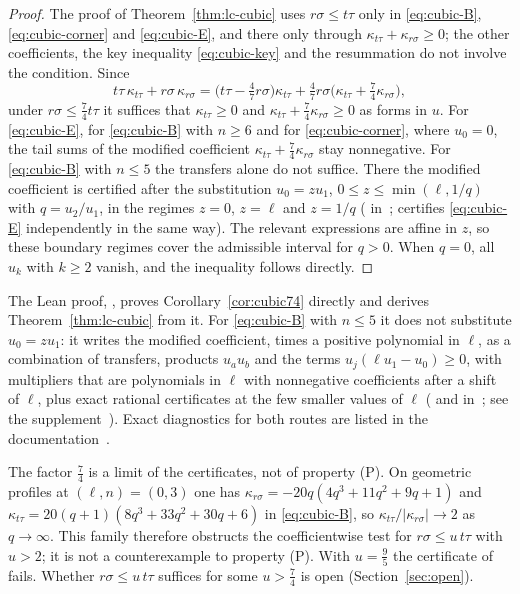 \begin{proof}
The proof of Theorem~\ref{thm:lc-cubic} uses $r\sigma\leq t\tau$ only in \eqref{eq:cubic-B}, \eqref{eq:cubic-corner} and \eqref{eq:cubic-E}, and there only through $\kappa_{t\tau}+\kappa_{r\sigma}\geq0$; the other coefficients, the key inequality \eqref{eq:cubic-key} and the resummation do not involve the condition. Since
\[
t\tau\,\kappa_{t\tau}+r\sigma\,\kappa_{r\sigma}=\bigl(t\tau-\tfrac47r\sigma\bigr)\kappa_{t\tau}+\tfrac47r\sigma\bigl(\kappa_{t\tau}+\tfrac74\kappa_{r\sigma}\bigr),
\]
under $r\sigma\leq\frac74t\tau$ it suffices that $\kappa_{t\tau}\geq0$ and $\kappa_{t\tau}+\frac74\kappa_{r\sigma}\geq0$ as forms in $u$. For \eqref{eq:cubic-E}, for \eqref{eq:cubic-B} with $n\geq6$ and for \eqref{eq:cubic-corner}, where $u_0=0$, the tail sums of the modified coefficient $\kappa_{t\tau}+\frac74\kappa_{r\sigma}$ stay nonnegative. For \eqref{eq:cubic-B} with $n\leq5$ the transfers alone do not suffice. There the modified coefficient is certified after the substitution $u_0=zu_1$, $0\leq z\leq\min(\ell,1/q)$ with $q=u_2/u_1$, in the regimes $z=0$, $z=\ell$ and $z=1/q$ ( in~\cite{code};  certifies \eqref{eq:cubic-E} independently in the same way). The relevant expressions are affine in $z$, so these boundary regimes cover the admissible interval for $q>0$. When $q=0$, all $u_k$ with $k\geq2$ vanish, and the inequality follows directly.
\end{proof}

The Lean proof, , proves Corollary~\ref{cor:cubic74} directly and derives Theorem~\ref{thm:lc-cubic} from it. For \eqref{eq:cubic-B} with $n\leq5$ it does not substitute $u_0=zu_1$: it writes the modified coefficient, times a positive polynomial in $\ell$, as a combination of transfers, products $u_au_b$ and the terms $u_j(\ell u_1-u_0)\geq0$, with multipliers that are polynomials in $\ell$ with nonnegative coefficients after a shift of $\ell$, plus exact rational certificates at the few smaller values of $\ell$ ( and  in~\cite{code}; see the supplement~\cite{suppB}). Exact diagnostics for both routes are listed in the documentation~\cite{docs}.

\begin{remark}\label{rem:cubic-limit}
The factor $\frac74$ is a limit of the certificates, not of property (P). On geometric profiles at $(\ell,n)=(0,3)$ one has $\kappa_{r\sigma}=-20q(4q^3+11q^2+9q+1)$ and $\kappa_{t\tau}=20(q+1)(8q^3+33q^2+30q+6)$ in \eqref{eq:cubic-B}, so $\kappa_{t\tau}/|\kappa_{r\sigma}|\to2$ as $q\to\infty$. This family therefore obstructs the coefficientwise test for $r\sigma\leq u\,t\tau$ with $u>2$; it is not a counterexample to property (P). With $u=\frac95$ the certificate of  fails. Whether $r\sigma\leq u\,t\tau$ suffices for some $u>\frac74$ is open (Section~\ref{sec:open}).
\end{remark}

